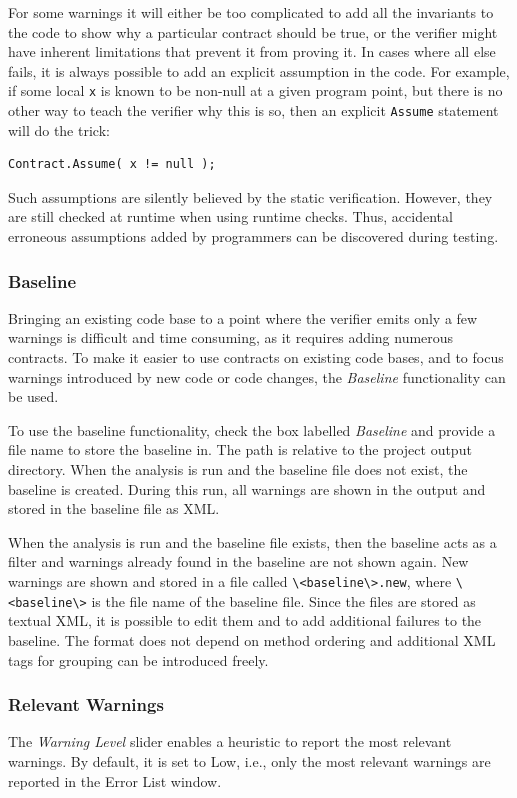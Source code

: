 \documentclass{article}
\newcommand{\code}[1]{\lstinline{#1}}
\begin{document}
For some warnings it will either be too complicated to add all the
invariants to the code to show why a particular contract should be
true, or the verifier might have inherent limitations that prevent it
from proving it. In cases where all else fails, it is always possible
to add an explicit assumption in the code. For example, if some local
\code{x} is known to be non-null at a given program point, but there
is no other way to teach the verifier why this is so, then an explicit
\code{Assume} statement will do the trick:
\begin{lstlisting}
Contract.Assume( x != null );
\end{lstlisting}
Such assumptions are silently believed by the static
verification. However, they are still checked at runtime when using
runtime checks. Thus, accidental erroneous assumptions added by
programmers can be discovered during testing.

\subsubsection{Baseline}
Bringing an existing code base to a point where the verifier emits
only a few warnings is difficult and time consuming, as it requires
adding numerous contracts. To make it easier to use contracts on
existing code bases, and to focus warnings introduced by new code or
code changes, the \emph{Baseline} functionality can be used.

To use the baseline functionality, check the box labelled
\emph{Baseline} and provide a file name to store the baseline in. The
path is relative to the project output directory.  When the analysis
is run and the baseline file does not exist, the baseline is
created. During this run, all warnings are shown in the output and
stored in the baseline file as XML.

When the analysis is run and the baseline file exists, then the
baseline acts as a filter and warnings already found in the baseline
are not shown again. New warnings are shown and stored in a file
called \code{\<baseline\>.new}, where \code{\<baseline\>} is the file
name of the baseline file. Since the files are stored as textual XML,
it is possible to edit them and to add additional failures to the baseline.
The format does not depend on method ordering and additional XML tags
for grouping can be introduced freely.

\subsubsection{Relevant Warnings}
\label{sec:relevantWarnings}
The \emph{Warning Level} slider enables a heuristic to report the most relevant warnings. 
By default, it is set to Low, i.e., only the most relevant warnings are reported in the Error List window. 
\end{document}
